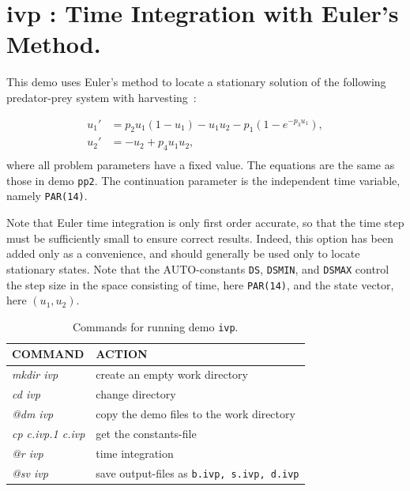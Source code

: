 \documentclass[12pt]{report}
\begin{document}
\newpage
\section{ ivp :  Time Integration with Euler's Method.} \label{sec:Demos_ivp}
This demo uses Euler's method to locate a stationary solution of the
following predator-prey system with harvesting~:

\begin{equation} \begin{array}{cl}
  u_1 ' &= p_2 u_1 (1 - u_1 ) - u_1 u_2 - p_1 (1-e^{-p_3 u_1}) ,\\
  u_2 ' &= -u_2  + p_4 u_1 u_2  ,\\\end{array} \end{equation}
where all problem parameters have a fixed value.
The equations are the same as those in demo {\tt pp2}.
The continuation parameter is the independent time variable, namely {\tt PAR(14)}.

Note that Euler time integration is only first order accurate, so that
the time step must be sufficiently small to ensure correct results.
Indeed, this option has been added only as a convenience, and should 
generally be used only to locate stationary states.
Note that the {\cal AUTO}-constants {\tt DS}, {\tt DSMIN}, and {\tt DSMAX}
control the step size
in the space consisting of time, here {\tt PAR(14)}, and the state vector,
here $(u_1,u_2)$.

\begin{table}[htbp]
\begin{center}
\begin{tabular}{| l | l |}
\hline
  COMMAND  & ACTION \\
\hline
  {\it mkdir ivp} & create an empty work directory \\ 
  {\it cd ivp} & change directory \\
  {\it @dm ivp} & copy the demo files to the work directory \\
\hline
  {\it cp c.ivp.1 c.ivp} & get the constants-file \\ 
  {\it @r ivp} & time integration \\ 
  {\it @sv ivp} & save output-files as {\tt b.ivp, s.ivp, d.ivp} \\ 
\hline
\end{tabular}
\caption{Commands for running demo {\tt ivp}.}
\label{tbl:demo_ivp}
\end{center}
\end{table}
\end{document}
